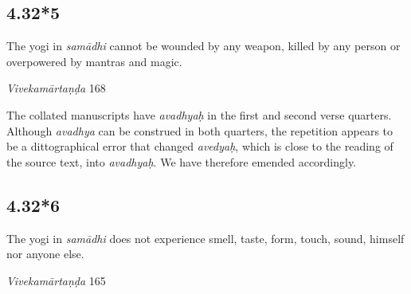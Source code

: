 \begin{ekdosis}
\subsection*{4.32*5}
\begin{translation}[hp04_032_5]
The yogi in \textit{samādhi} cannot be wounded by any weapon, killed by any person or overpowered by mantras and magic.
\end{translation}


\begin{sources}[hp04_032_5]
\emph{Vivekamārtaṇḍa} 168
\begin{versinnote}
\end{versinnote}
\end{sources}


\begin{philcomm}[hp04_032_5]
The collated manuscripts have \emph{avadhyaḥ} in the first and second verse quarters. Although \emph{avadhya} can be construed in both quarters, the repetition appears to be a dittographical error that changed \emph{avedyaḥ}, which is close to the reading of the source text, into \emph{avadhyaḥ}. We have therefore emended accordingly. 
\end{philcomm}

\subsection*{4.32*6}
\begin{translation}[hp04_032_6]
The yogi in \textit{samādhi} does not experience smell, taste, form, touch, sound, himself nor anyone else.
\end{translation}

\begin{sources}[hp04_032_6]
\emph{Vivekamārtaṇḍa} 165
\begin{versinnote}
\end{versinnote}
\end{sources}


\end{ekdosis}
